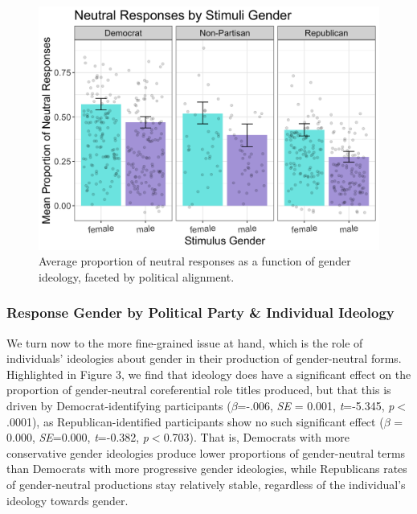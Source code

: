 \documentclass[10pt,letterpaper]{article}
\begin{document}
		\begin{figure}[ht!]
		\centering
		\includegraphics[scale=0.115]{prod_neutral_gender_bar_nonmean.png}
		\caption{Average proportion of neutral responses as a function of gender ideology, faceted by political alignment.}
		\label{prod-neutral-poli-box-gender}
	\end{figure}
	
	\subsubsection{Response Gender by Political Party \& Individual Ideology}
	We turn now to the more fine-grained issue at hand, which is the role of individuals' ideologies about gender in their production of gender-neutral forms. Highlighted in Figure 3, we find that ideology does have a significant effect on the proportion of gender-neutral coreferential role titles produced, but that this is driven by Democrat-identifying participants ($\beta$=-.006, \textit{SE} = 0.001, \textit{t}=-5.345, \textit{p}$<$.0001), as Republican-identified participants show no such significant effect ($\beta$ = 0.000, \textit{SE}=0.000, \textit{t}=-0.382, \textit{p}$<$0.703). That is, Democrats with more conservative gender ideologies produce lower proportions of gender-neutral terms than Democrats with more progressive gender ideologies, while Republicans rates of gender-neutral productions stay relatively stable, regardless of the individual's ideology towards gender.
			
\end{document}
